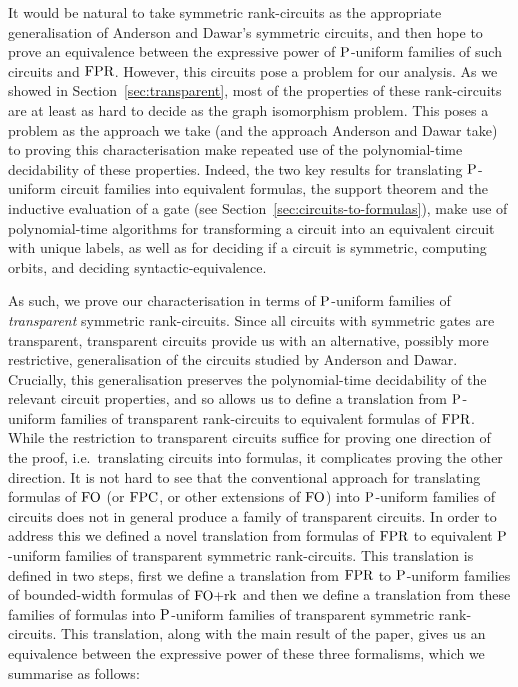 \documentclass[../paper.tex]{subfiles}
\begin{document}
It would be natural to take symmetric rank-circuits as the appropriate
generalisation of Anderson and Dawar's symmetric circuits, and then hope to
prove an equivalence between the expressive power of $\mathrm{P}$-uniform families of
such circuits and $\text{\upshape FPR}$. However, this circuits pose a problem for our
analysis. As we showed in Section~\ref{sec:transparent}, most of the properties
of these rank-circuits are at least as hard to decide as the graph isomorphism
problem. This poses a problem as the approach we take (and the approach Anderson
and Dawar take) to proving this characterisation make repeated use of the
polynomial-time decidability of these properties. Indeed, the two key results
for translating $\mathrm{P}$-uniform circuit families into equivalent formulas, the
support theorem and the inductive evaluation of a gate (see
Section~\ref{sec:circuits-to-formulas}), make use of polynomial-time algorithms
for transforming a circuit into an equivalent circuit with unique labels, as
well as for deciding if a circuit is symmetric, computing orbits, and deciding
syntactic-equivalence.

As such, we prove our characterisation in terms of $\mathrm{P}$-uniform families of
\emph{transparent} symmetric rank-circuits. Since all circuits with symmetric
gates are transparent, transparent circuits provide us with an alternative,
possibly more restrictive, generalisation of the circuits studied by Anderson
and Dawar. Crucially, this generalisation preserves the polynomial-time
decidability of the relevant circuit properties, and so allows us to define a
translation from $\mathrm{P}$-uniform families of transparent rank-circuits to
equivalent formulas of $\text{\upshape FPR}$. While the restriction to transparent circuits
suffice for proving one direction of the proof, i.e.\ translating circuits into
formulas, it complicates proving the other direction. It is not hard to see that
the conventional approach for translating formulas of $\text{\upshape FO}$ (or $\text{\upshape FPC}$, or other
extensions of $\text{\upshape FO}$) into $\mathrm{P}$-uniform families of circuits does not in general
produce a family of transparent circuits. In order to address this we defined a
novel translation from formulas of $\text{\upshape FPR}$ to equivalent $\mathrm{P}$-uniform families
of transparent symmetric rank-circuits. This translation is defined in two
steps, first we define a translation from $\text{\upshape FPR}$ to $\mathrm{P}$-uniform families of
bounded-width formulas of $\text{\upshape FO+rk}$ and then we define a translation from these
families of formulas into $\mathrm{P}$-uniform families of transparent symmetric
rank-circuits. This translation, along with the main result of the paper, gives
us an equivalence between the expressive power of these three formalisms, which
we summarise as follows:
\end{document}
